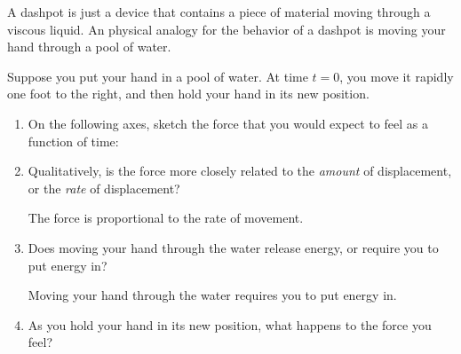\begin{activity}
\begin{model}
	A dashpot is just a device that contains a piece of material moving through a viscous liquid. An physical analogy for the behavior of a dashpot is moving your hand through a pool of water.
	
\end{model}

\begin{ctqs}
	
	\question  Suppose you put your hand in a pool of water. At time $t=0$, you move it rapidly one foot to the right, and then hold your hand in its new position.\label{\labelbase:ctq:poolstepstrain}
	
		\begin{enumerate}
			\item On the following axes, sketch the force that you would expect to feel as a function of time:
			
				\begin{solution}[1.5in]
				\end{solution}
			
			\item Qualitatively, is the force more closely related to the \emph{amount} of displacement, or the \emph{rate} of displacement?
			
				\begin{solution}[1.2in]
					The force is proportional to the rate of movement.
				\end{solution}
			
			\item Does moving your hand through the water release energy, or require you to put energy in?
			
				\begin{solution}[1.2in]
					Moving your hand through the water requires you to put energy in.
				\end{solution}
				
			\item As you hold your hand in its new position, what happens to the force you feel?
			

\end{enumerate}
\end{ctqs}
\end{activity}
